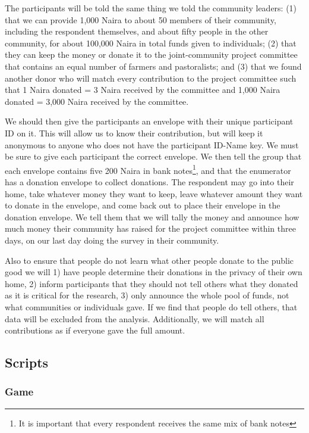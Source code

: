 \documentclass[
]{article}
\begin{document}
The participants will be told the same thing we told the community
leaders: (1) that we can provide 1,000 Naira to about 50 members of
their community, including the respondent themselves, and about fifty
people in the other community, for about 100,000 Naira in total funds
given to individuals; (2) that they can keep the money or donate it to
the joint-community project committee that contains an equal number of
farmers and pastoralists; and (3) that we found another donor who will
match every contribution to the project committee such that 1 Naira
donated = 3 Naira received by the committee and 1,000 Naira donated =
3,000 Naira received by the committee.

We should then give the participants an envelope with their unique
participant ID on it. This will allow us to know their contribution, but
will keep it anonymous to anyone who does not have the participant
ID-Name key. We must be sure to give each participant the correct
envelope. We then tell the group that each envelope contains five 200
Naira in bank notes\footnote{It is important that every respondent
  receives the same mix of bank notes}, and that the enumerator has a
donation envelope to collect donations. The respondent may go into their
home, take whatever money they want to keep, leave whatever amount they
want to donate in the envelope, and come back out to place their
envelope in the donation envelope. We tell them that we will tally the
money and announce how much money their community has raised for the
project committee within three days, on our last day doing the survey in
their community.

Also to ensure that people do not learn what other people donate to the
public good we will 1) have people determine their donations in the
privacy of their own home, 2) inform participants that they should not
tell others what they donated as it is critical for the research, 3)
only announce the whole pool of funds, not what communities or
individuals gave. If we find that people do tell others, that data will
be excluded from the analysis. Additionally, we will match all
contributions as if everyone gave the full amount.

\hypertarget{scripts}{%
\subsection{Scripts}\label{scripts}}

\hypertarget{game}{%
\subsubsection{Game}\label{game}}
\end{document}
